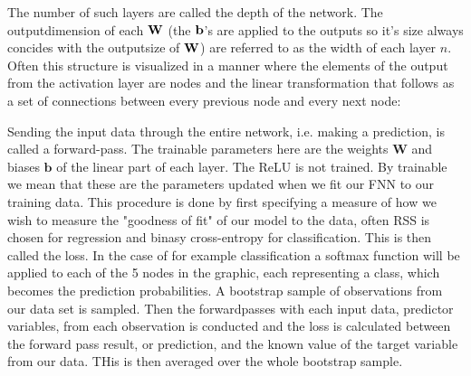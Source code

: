 \documentclass[nofootinbib,UKenglish,nobalancelastpage,12pt]{article}
\newcommand{\vect}{\ensuremath{\mathbf}}
\begin{document}
The number of such layers are called the depth of the network. The outputdimension of each $\vect{W}$ (the $\vect{b}$'s are applied to the outputs so it's size always concides with the outputsize of $\vect{W}$) are referred to as the width of each layer $n$. Often this structure is visualized in a manner where the elements of the output from the activation layer are nodes and the linear transformation that follows as a set of connections between every previous node and every next node:
\begin{center}
    

\end{center}
\clearpage
Sending the input data through the entire network, i.e. making a prediction, is called a forward-pass. The trainable parameters here are the weights $\textbf{W}$ and biases $\textbf{b}$ of the linear part of each layer. The ReLU is not trained. By trainable we mean that these are the parameters updated when we fit our FNN to our training data. This procedure is done by first specifying a measure of how we wish to measure the "goodness of fit" of our model to the data, often RSS is chosen for regression and binasy cross-entropy for classification. This is then called the loss. In the case of for example classification a softmax function will be applied to each of the 5 nodes in the graphic, each representing a class, which becomes the prediction probabilities. A bootstrap sample of observations from our data set is sampled. Then the forwardpasses with each input data, predictor variables, from each observation is conducted and the loss is calculated between the forward pass result, or prediction, and the known value of the target variable from our data. THis is then averaged over the whole bootstrap sample. 
\end{document}
